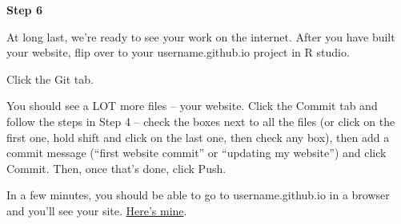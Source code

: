\documentclass[
]{book}
\begin{document}
\textbf{Step 6}

At long last, we're ready to see your work on the internet. After you have built your website, flip over to your username.github.io project in R studio.

Click the Git tab.

You should see a LOT more files -- your website. Click the Commit tab and follow the steps in Step 4 -- check the boxes next to all the files (or click on the first one, hold shift and click on the last one, then check any box), then add a commit message (``first website commit'' or ``updating my website'') and click Commit. Then, once that's done, click Push.

In a few minutes, you should be able to go to username.github.io in a browser and you'll see your site. \href{http://mattwaite.github.io/}{Here's mine}.

  
\end{document}
